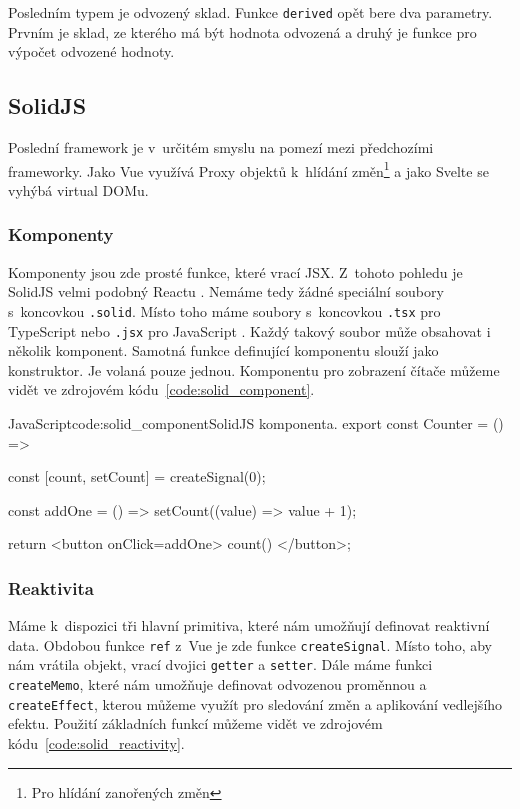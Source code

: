 \documentclass[
  master,
  program=ainf,
  tables=false,
  sourcecodes,
  glossaries,
  index
]{kidiplom}
\begin{document}
Posledním typem je odvozený sklad. Funkce {\tt derived} opět bere dva parametry. Prvním je sklad, ze kterého
má být hodnota odvozená a druhý je funkce pro výpočet odvozené hodnoty.

\subsection{SolidJS}

Poslední framework je v~určitém smyslu na pomezí mezi předchozími frameworky. Jako Vue \cite{vue} využívá Proxy objektů \cite{proxy}
k~hlídání změn\footnote{Pro hlídání zanořených změn} a jako Svelte \cite{svelte} se vyhýbá virtual DOMu.

\subsubsection{Komponenty}

Komponenty jsou zde prosté funkce, které vrací JSX. Z~tohoto pohledu je SolidJS \cite{solidjs} velmi podobný Reactu \cite{react}.
Nemáme tedy žádné speciální soubory s~koncovkou {\tt .solid}. Místo toho máme soubory s~koncovkou {\tt .tsx} pro
TypeScript \cite{ts} nebo {\tt .jsx} pro JavaScript \cite{js}. Každý takový soubor může obsahovat i několik komponent. Samotná
funkce definující komponentu slouží jako konstruktor. Je volaná pouze jednou. Komponentu pro zobrazení
čítače můžeme vidět ve zdrojovém kódu~\ref{code:solid_component}.

  \begin{kicode}{JavaScript}{code:solid_component}{SolidJS komponenta.}
    export const Counter = () => {
      const [count, setCount] = createSignal(0);

      const addOne = () => setCount((value) => value + 1);

      return <button onClick={addOne}> {count()} </button>;
    }
  \end{kicode}

\subsubsection{Reaktivita}

Máme k~dispozici tři hlavní primitiva, které nám umožňují definovat reaktivní data. Obdobou funkce {\tt ref}
z~Vue \cite{vue} je zde funkce {\tt createSignal}. Místo toho, aby nám vrátila objekt, vrací dvojici {\tt getter} a {\tt setter}.
Dále máme funkci {\tt createMemo}, které nám umožňuje definovat odvozenou proměnnou a {\tt createEffect}, kterou 
můžeme využít pro sledování změn a aplikování vedlejšího efektu. Použití základních funkcí můžeme vidět ve 
zdrojovém kódu~\ref{code:solid_reactivity}.
\end{document}
